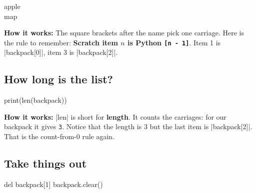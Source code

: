 \begin{outputbox}
apple\\
map
\end{outputbox}

\textbf{How it works:} The square brackets after the name pick one carriage. Here is the rule to remember: \textbf{Scratch item $n$ is Python \texttt{[n - 1]}}. Item 1 is \py|backpack[0]|, item 3 is \py|backpack[2]|.

\subsection*{How long is the list?}

\begin{tcbraster}[raster columns=2, raster equal height=rows, raster column skip=12pt, raster valign=center]
\begin{tcolorbox}[colback=white, colframe=white, boxrule=0pt, valign=center]
\begin{scratch}
\end{scratch}
\end{tcolorbox}
\begin{code}
print(len(backpack))
\end{code}
\end{tcbraster}

\textbf{How it works:} \py|len| is short for \textbf{length}. It counts the carriages: for our backpack it gives \texttt{3}. Notice that the length is 3 but the last item is \py|backpack[2]|. That is the count-from-0 rule again.

\subsection*{Take things out}

\begin{tcbraster}[raster columns=2, raster equal height=rows, raster column skip=12pt, raster valign=center]
\begin{tcolorbox}[colback=white, colframe=white, boxrule=0pt, valign=center]
\begin{scratch}
\end{scratch}
\end{tcolorbox}
\begin{code}
del backpack[1]
backpack.clear()
\end{code}
\end{tcbraster}

